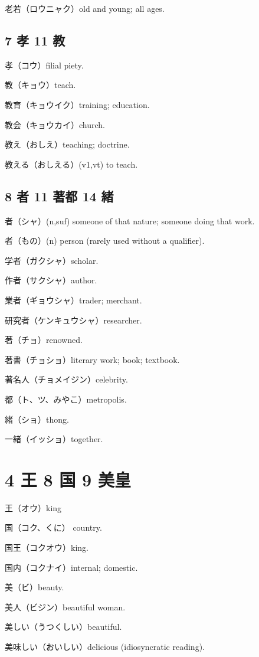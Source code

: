 老若（ロウニャク）old and young; all ages.

\subsection{7 孝 11 教}

孝（コウ）filial piety.

教（キョウ）teach.

教育（キョウイク）training; education.

教会（キョウカイ）church.

教え（おしえ）teaching; doctrine.

教える（おしえる）(v1,vt) to teach.

\subsection{8 者 11 著都 14 緒}

者（シャ）(n,suf) someone of that nature; someone doing that work.

者（もの）(n) person (rarely used without a qualifier).

学者（ガクシャ）scholar.

作者（サクシャ）author.

業者（ギョウシャ）trader; merchant.

研究者（ケンキュウシャ）researcher.

著（チョ）renowned.

著書（チョショ）literary work; book; textbook.

著名人（チョメイジン）celebrity.

都（ト、ツ、みやこ）metropolis.

緒（ショ）thong.

一緒（イッショ）together.

\section{4 王 8 国 9 美皇}

王（オウ）king

国（コク、くに） country.

国王（コクオウ）king.

国内（コクナイ）internal; domestic.

美（ビ）beauty.

美人（ビジン）beautiful woman.

美しい（うつくしい）beautiful.

美味しい（おいしい）delicious (idiosyncratic reading).

